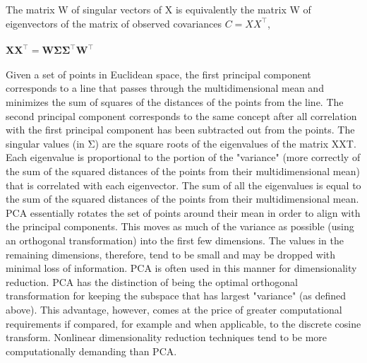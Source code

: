 \documentclass[10pt,a4paper]{article}
\begin{document}
The matrix W of singular vectors of X is equivalently the matrix W of eigenvectors of the matrix of observed covariances \begin{math} C = X X^\top \end{math}, \\ \\
\begin{math}    \mathbf{X}\mathbf{X}^\top = \mathbf{W}\mathbf{\Sigma}\mathbf{\Sigma}^\top\mathbf{W}^\top \end{math} \\ \\
Given a set of points in Euclidean space, the first principal component corresponds to a line that passes through the multidimensional mean and minimizes the sum of squares of the distances of the points from the line. The second principal component corresponds to the same concept after all correlation with the first principal component has been subtracted out from the points. The singular values (in Σ) are the square roots of the eigenvalues of the matrix XXT. Each eigenvalue is proportional to the portion of the "variance" (more correctly of the sum of the squared distances of the points from their multidimensional mean) that is correlated with each eigenvector. The sum of all the eigenvalues is equal to the sum of the squared distances of the points from their multidimensional mean. PCA essentially rotates the set of points around their mean in order to align with the principal components. This moves as much of the variance as possible (using an orthogonal transformation) into the first few dimensions. The values in the remaining dimensions, therefore, tend to be small and may be dropped with minimal loss of information. PCA is often used in this manner for dimensionality reduction. PCA has the distinction of being the optimal orthogonal transformation for keeping the subspace that has largest "variance" (as defined above). This advantage, however, comes at the price of greater computational requirements if compared, for example and when applicable, to the discrete cosine transform. Nonlinear dimensionality reduction techniques tend to be more computationally demanding than PCA. \\ \\
\end{document}
